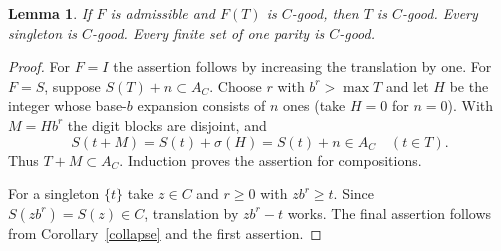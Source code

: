 \documentclass[11pt]{article}
\newtheorem{lemma}{Lemma}
\begin{document}
\begin{lemma}\label{lift}
If $F$ is admissible and $F(T)$ is $C$-good, then $T$ is $C$-good.
Every singleton is $C$-good. Every finite set of one parity is $C$-good.
\end{lemma}
\begin{proof}
For $F=I$ the assertion follows by increasing the translation by one.
For $F=S$, suppose $S(T)+n\subset A_C$. Choose $r$ with $b^r>\max T$
and let $H$ be the integer whose base-$b$ expansion consists of $n$
ones (take $H=0$ for $n=0$). With $M=Hb^r$ the digit blocks are disjoint,
and
\[
S(t+M)=S(t)+\sigma(H)=S(t)+n\in A_C\quad(t\in T).
\]
Thus $T+M\subset A_C$. Induction proves the assertion for compositions.

For a singleton $\{t\}$ take $z\in C$ and $r\ge0$ with $zb^r\ge t$.
Since $S(zb^r)=S(z)\in C$, translation by $zb^r-t$ works. The final
assertion follows from Corollary~\ref{collapse} and the first assertion.
\end{proof}
\end{document}
